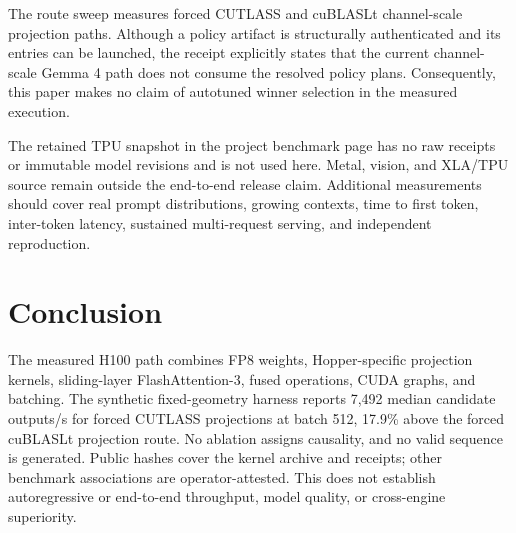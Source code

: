 The route sweep measures forced CUTLASS and cuBLASLt channel-scale projection
paths. Although a policy
artifact is structurally authenticated and its entries can be launched, the
receipt explicitly states that the current channel-scale Gemma 4 path does not
consume the resolved policy plans. Consequently, this paper makes no claim of
autotuned winner selection in the measured execution.

The retained TPU snapshot in the project benchmark page has no raw receipts or
immutable model revisions and is not used here. Metal, vision, and XLA/TPU
source remain outside the end-to-end release claim. Additional measurements
should cover real prompt distributions, growing contexts, time to first token,
inter-token latency, sustained multi-request serving, and independent
reproduction.

\section{Conclusion}

The measured H100 path combines FP8 weights, Hopper-specific projection kernels,
sliding-layer FlashAttention-3, fused operations, CUDA graphs, and batching. The
synthetic fixed-geometry harness reports 7,492 median candidate outputs/s for
forced CUTLASS projections at batch 512, 17.9\% above the forced cuBLASLt
projection route. No ablation assigns causality, and no valid sequence is
generated. Public hashes cover the kernel archive and receipts; other benchmark
associations are operator-attested. This does not establish autoregressive or
end-to-end throughput, model quality, or cross-engine superiority.

\clearpage
\begingroup
\small
\setlength{\bibsep}{0.35em}


\endgroup
